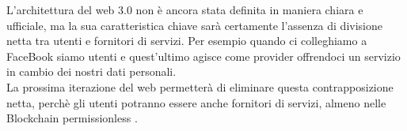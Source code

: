 L'architettura del web 3.0 non è ancora stata definita in maniera chiara e ufficiale, ma la sua caratteristica chiave sarà certamente l'assenza
di divisione netta tra utenti e fornitori di servizi. Per esempio quando ci colleghiamo a FaceBook siamo utenti e quest'ultimo agisce come provider 
offrendoci un servizio in cambio dei nostri dati personali. 
\\La prossima iterazione del web permetterà di eliminare questa contrapposizione netta, perchè
gli utenti potranno essere anche fornitori di servizi, almeno nelle Blockchain permissionless \cite{Blockchain_guida_allecosistema}.
